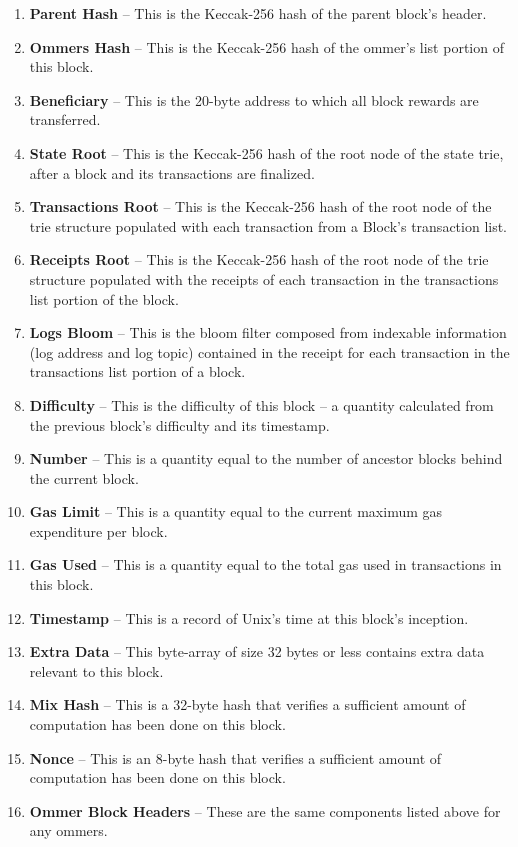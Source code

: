 \documentclass[10pt,a4paper,leqno,bibliography=totoc]{scrartcl}
\newenvironment{alphafootnotes}
{\par\edef\savedfootnotenumber{\number\value{footnote}}
\renewcommand{\thefootnote}{\alph{footnote}}
\setcounter{footnote}{0}}
{\par\setcounter{footnote}{\savedfootnotenumber}}
\begin{document}
\begin{alphafootnotes}
\begin{multicols*}{2}
				\begin{enumerate}
					\item \textbf{Parent Hash} -- This is the Keccak-256 hash of the parent block's header.
					\item \textbf{Ommers Hash} -- This is the Keccak-256 hash of the ommer's list portion of this block.
					\item \textbf{Beneficiary} -- This is the 20-byte address to which all block rewards are transferred.
					\item \textbf{State Root} -- This is the Keccak-256 hash of the root node of the state trie, after a block and its transactions are finalized.
					\item \textbf{Transactions Root} -- This is the Keccak-256 hash of the root node of the trie structure populated with each transaction from a Block's transaction list.
					\item \textbf{Receipts Root} -- This is the Keccak-256 hash of the root node of the trie structure populated with the receipts of each transaction in the transactions list portion of the block.
					\item \textbf{Logs Bloom} -- This is the bloom filter composed from indexable information (log address and log topic) contained in the receipt for each transaction in the transactions list portion of a block.
					\item \textbf{Difficulty} -- This is the difficulty of this block -- a quantity calculated from the previous block's difficulty and its timestamp.
					\item \textbf{Number} -- This is a quantity equal to the number of ancestor blocks behind the current block.
					\item \textbf{Gas Limit} -- This is a quantity equal to the current maximum gas expenditure per block.
					\item \textbf{Gas Used} -- This is a quantity equal to the total gas used in transactions in this block.
					\item \textbf{Timestamp} -- This is a record of Unix's time at this block's inception.
					\item \textbf{Extra Data} -- This byte-array of size 32 bytes or less contains extra data relevant to this block.
					\item \textbf{Mix Hash} -- This is a 32-byte hash that verifies a sufficient amount of computation has been done on this block.
					\item \textbf{Nonce} -- This is an 8-byte hash that verifies a sufficient amount of computation has been done on this block.
					\item \textbf{Ommer Block Headers} -- These are the same components listed above for any ommers.
				

\end{enumerate}
\end{multicols*}
\end{alphafootnotes}
\end{document}
